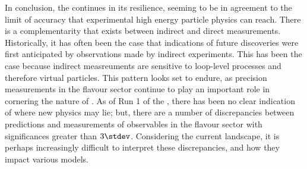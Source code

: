 
In conclusion, the \sm continues in its resilience, seeming to be in agreement to the limit of
accuracy that experimental high energy particle physics can reach.
There is a complementarity that exists between indirect and direct measurements.
Historically, it has often been the case that indications of future discoveries were first
anticipated by observations made by indirect experiments.
This has been the case because indirect measreuments are sensitive to loop-level processes and
therefore virtual particles.
This pattern looks set to endure,
as precision measurements in the flavour sector continue to play an important role in
cornering the nature of \np.
As of Run 1 of the \lhc, there has been no clear indication of where new physics may lie;
but, there are a number of discrepancies between \sm predictions and measurements of observables in
the flavour sector with significances greater than $3\stdev$.
Considering the current landscape, it is perhaps increasingly difficult to interpret these
discrepancies, and how they impact various \np models.




